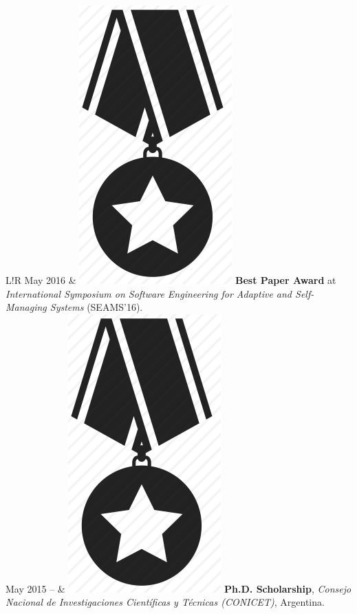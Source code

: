 \documentclass[10pt]{article}
\newcommand\VRule{\color{lightgray}\vrule width 0.5pt}
\begin{document}
\begin{tabular}{L!{\VRule}R}
May 2016 & \includegraphics[scale=0.022]{img/medal.png}
\textbf{Best Paper Award} at \textit{International Symposium on 
Software Engineering for Adaptive and Self-Managing Systems} (SEAMS'16).\\

May 2015 -- & \includegraphics[scale=0.022]{img/medal.png} \hspace{-0.85mm} 
\textbf{Ph.D. 
Scholarship}, \textit{Consejo Nacional de 
Investigaciones Cient\'ificas y T\'ecnicas (CONICET)}, Argentina.\\


\end{tabular}
\end{document}
